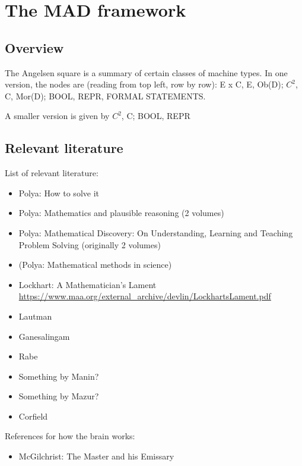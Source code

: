 
\section{The MAD framework}



\subsection{Overview}

The Angelsen square is a summary of certain classes of machine types. In one version, the nodes are (reading from top left, row by row): E x C, E, Ob(D); $C^2$, C, Mor(D); BOOL, REPR, FORMAL STATEMENTS.

A smaller version is given by $C^2$, C; BOOL, REPR


\subsection{Relevant literature}

List of relevant literature:

\begin{itemize}
\item Polya: How to solve it
\item Polya: Mathematics and plausible reasoning (2 volumes)
\item Polya: Mathematical Discovery: On Understanding, Learning and Teaching Problem Solving (originally 2 volumes)
\item (Polya: Mathematical methods in science)
\item Lockhart: A Mathematician's Lament \url{https://www.maa.org/external_archive/devlin/LockhartsLament.pdf}
\item Lautman
\item Ganesalingam
\item Rabe
\item Something by Manin?
\item Something by Mazur?
\item Corfield


\end{itemize}

References for how the brain works:

\begin{itemize}
\item McGilchrist: The Master and his Emissary

\end{itemize}

